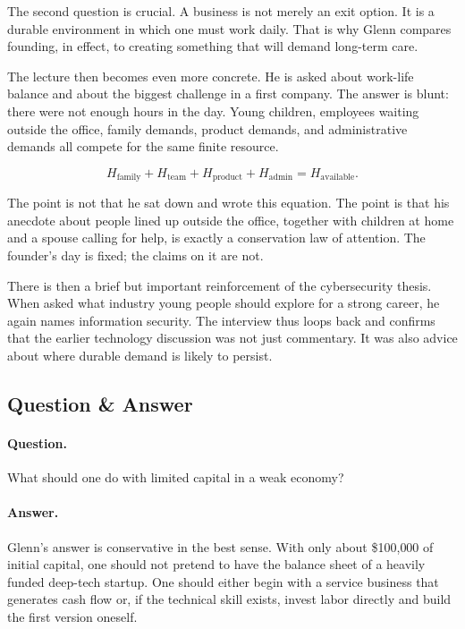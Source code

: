 The second question is crucial. A business is not merely an exit option. It is a durable environment in which one must work daily. That is why Glenn compares founding, in effect, to creating something that will demand long-term care.

The lecture then becomes even more concrete. He is asked about work-life balance and about the biggest challenge in a first company. The answer is blunt: there were not enough hours in the day. Young children, employees waiting outside the office, family demands, product demands, and administrative demands all compete for the same finite resource.

\begin{equation}
H_{\mathrm{family}} + H_{\mathrm{team}} + H_{\mathrm{product}} + H_{\mathrm{admin}}
= H_{\mathrm{available}}.
\end{equation}

The point is not that he sat down and wrote this equation. The point is that his anecdote about people lined up outside the office, together with children at home and a spouse calling for help, is exactly a conservation law of attention. The founder's day is fixed; the claims on it are not.

There is then a brief but important reinforcement of the cybersecurity thesis. When asked what industry young people should explore for a strong career, he again names information security. The interview thus loops back and confirms that the earlier technology discussion was not just commentary. It was also advice about where durable demand is likely to persist.

\subsection{Question \& Answer}

\paragraph{Question.} What should one do with limited capital in a weak economy?

\paragraph{Answer.} Glenn's answer is conservative in the best sense. With only about \$100{,}000 of initial capital, one should not pretend to have the balance sheet of a heavily funded deep-tech startup. One should either begin with a service business that generates cash flow or, if the technical skill exists, invest labor directly and build the first version oneself.

